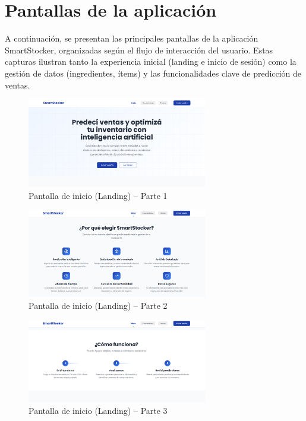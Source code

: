 \section{Pantallas de la aplicación}

A continuación, se presentan las principales pantallas de la aplicación SmartStocker, organizadas según el flujo de interacción del usuario. Estas capturas ilustran tanto la experiencia inicial (landing e inicio de sesión) como la gestión de datos (ingredientes, ítems) y las funcionalidades clave de predicción de ventas.

\begin{figure}[htbp]
    \centering
    \includegraphics[width=0.7\textwidth]{images/landing1.png}
    \caption{Pantalla de inicio (Landing) – Parte 1}
    \label{fig:ux-landing1}
\end{figure}

\begin{figure}[htbp]
    \centering
    \includegraphics[width=0.7\textwidth]{images/landing2.png}
    \caption{Pantalla de inicio (Landing) – Parte 2}
    \label{fig:ux-landing2}
\end{figure}

\begin{figure}[htbp]
    \centering
    \includegraphics[width=0.7\textwidth]{images/landing3.png}
    \caption{Pantalla de inicio (Landing) – Parte 3}
    \label{fig:ux-landing3}
\end{figure}

